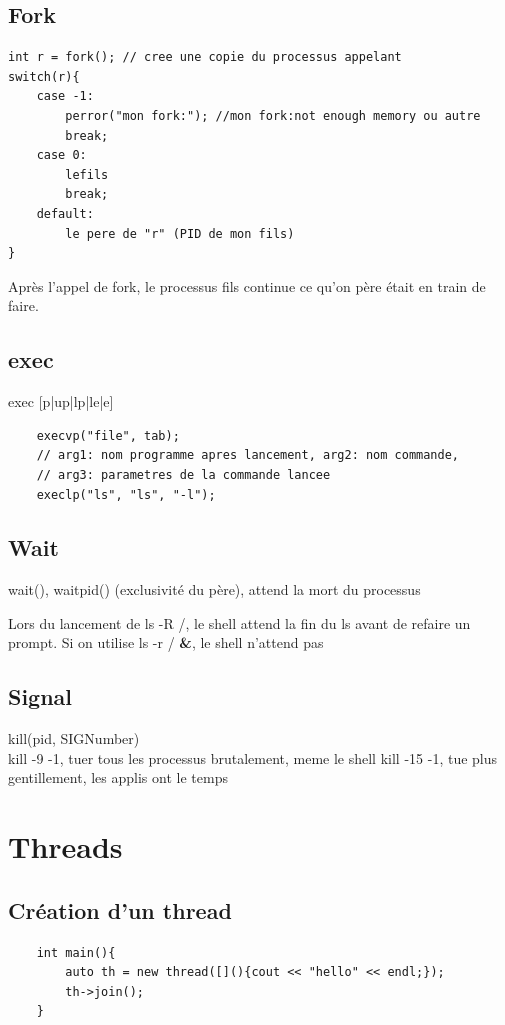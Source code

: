 \documentclass[11pt]{article}
\begin{document}
\subsection{Fork}
\begin{verbatim}
int r = fork(); // cree une copie du processus appelant  
switch(r){
	case -1:
		perror("mon fork:"); //mon fork:not enough memory ou autre
		break;
	case 0:
		lefils
		break;
	default:
		le pere de "r" (PID de mon fils)
}  
\end{verbatim}

Après l'appel de fork, le processus fils continue ce qu'on père était en train de faire.

\subsection{exec}
exec [p|up|lp|le|e]
\begin{verbatim}
	execvp("file", tab);
	// arg1: nom programme apres lancement, arg2: nom commande,
	// arg3: parametres de la commande lancee
	execlp("ls", "ls", "-l"); 
\end{verbatim}

\subsection{Wait}
wait(), waitpid() (exclusivité du père), attend la mort du processus

Lors du lancement de ls -R /, le shell attend la fin du ls avant de refaire un prompt.
Si on utilise ls -r / \textbf{\&}, le shell n'attend pas

\subsection{Signal}
kill(pid, SIGNumber)\\
kill -9 -1, tuer tous les processus brutalement, meme le shell
kill -15 -1, tue plus gentillement, les applis ont le temps

\pagebreak

\section{Threads}
\subsection{Création d'un thread}

\begin{verbatim}
	int main(){
		auto th = new thread([](){cout << "hello" << endl;});
		th->join();
	}	
\end{verbatim}
\end{document}
